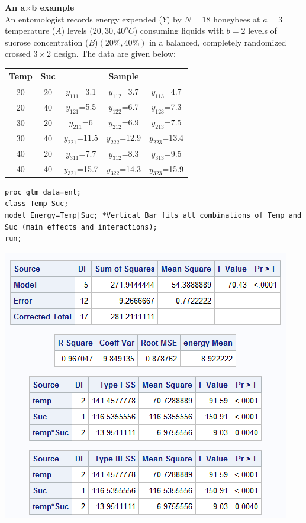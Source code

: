 \textbf{An a$\times$b example}\\
An entomologist records energy expended ($Y$) by $N=18$ honeybees at $a=3$ temperature ($A$) levels ($20,30,40^o C$) consuming liquids with $b=2$ levels of sucrose concentration ($B$)$(20\%,40\%)$ in a balanced, completely randomized crossed $3 \times 2$ design.  The data are given below:
\begin{center}
\begin{tabular}{|cc|ccc|}  \hline
Temp & Suc & \multicolumn{3}{c|}{Sample} \\ \hline
   20 & 20 & $y_{111}$=3.1 & $y_{112}$=3.7 & $y_{113}$=4.7 \\
   20 & 40 & $y_{121}$=5.5 & $y_{122}$=6.7 & $y_{123}$=7.3 \\
   30 & 20 & $y_{211}$=6 & $y_{212}$=6.9 & $y_{213}$=7.5 \\
   30 & 40 & $y_{221}$=11.5 & $y_{222}$=12.9 & $y_{223}$=13.4 \\
   40 & 20 & $y_{311}$=7.7 & $y_{312}$=8.3 & $y_{313}$=9.5 \\
   40 & 40 & $y_{321}$=15.7 & $y_{322}$=14.3 & $y_{323}$=15.9 \\\hline
\end{tabular}
\end{center}

\begin{small}
\begin{verbatim}
proc glm data=ent;
class Temp Suc;
model Energy=Temp|Suc; *Vertical Bar fits all combinations of Temp and Suc (main effects and interactions);
run;
\end{verbatim}
\end{small}

\begin{flushleft}
\includegraphics[scale=0.6]{Ent}
\end{flushleft}

